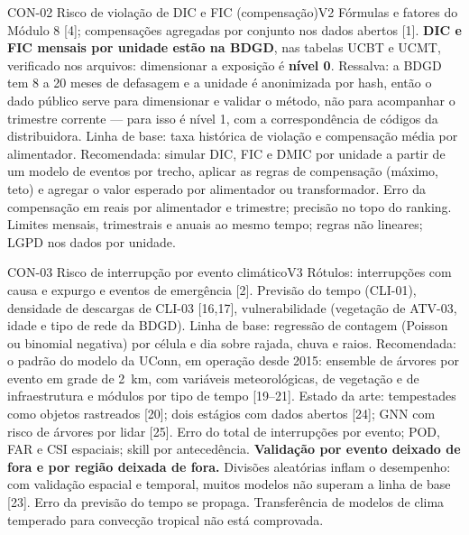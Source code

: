 \begin{ficha}{CON-02 \textperiodcentered{} Risco de violação de DIC e FIC (compensação)}{V2}
 Fórmulas e fatores do Módulo 8 [4]; compensações agregadas por
conjunto nos dados abertos [1]. \textbf{DIC e FIC mensais por unidade estão
na BDGD}, nas tabelas UCBT e UCMT, verificado nos arquivos: dimensionar a
exposição é \textbf{nível 0}. Ressalva: a BDGD tem 8 a 20 meses de defasagem e
a unidade é anonimizada por hash, então o dado público serve para dimensionar
e validar o método, não para acompanhar o trimestre corrente --- para isso é
nível 1, com a correspondência de códigos da distribuidora.
 Linha de base: taxa histórica de violação e compensação
média por alimentador. Recomendada: simular DIC, FIC e DMIC por unidade a
partir de um modelo de eventos por trecho, aplicar as regras de compensação
(máximo, teto) e agregar o valor esperado por alimentador ou transformador.
 Erro da compensação em reais por alimentador e trimestre;
precisão no topo do ranking.
 Limites mensais, trimestrais e anuais ao mesmo tempo;
regras não lineares; LGPD nos dados por unidade.
\end{ficha}

\begin{ficha}{CON-03 \textperiodcentered{} Risco de interrupção por evento climático}{V3}
 Rótulos: interrupções com causa e expurgo e eventos de
emergência [2]. Previsão do tempo (CLI-01), densidade de descargas de
CLI-03 [16,17], vulnerabilidade (vegetação de ATV-03, idade e tipo de rede da
BDGD).
 Linha de base: regressão de contagem (Poisson ou binomial
negativa) por célula e dia sobre rajada, chuva e raios. Recomendada: o
padrão do modelo da UConn, em operação desde 2015: ensemble de árvores por
evento em grade de 2~km, com variáveis meteorológicas, de vegetação e de
infraestrutura e módulos por tipo de tempo [19--21]. Estado da arte:
tempestades como objetos rastreados [20]; dois estágios com dados abertos
[24]; GNN com risco de árvores por lidar [25].
 Erro do total de interrupções por evento; POD, FAR e CSI
espaciais; skill por antecedência. \textbf{Validação por evento deixado de
fora e por região deixada de fora.}
 Divisões aleatórias inflam o desempenho: com validação
espacial e temporal, muitos modelos não superam a linha de base [23]. Erro da
previsão do tempo se propaga. Transferência de modelos de clima temperado
para convecção tropical não está comprovada.
\end{ficha}

